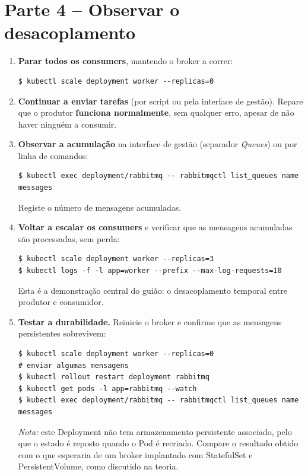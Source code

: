 \documentclass[11pt,a4paper]{article}
\begin{document}
\section{Parte 4 -- Observar o desacoplamento}
\begin{enumerate}[label=\arabic*.,resume]

  \item \textbf{Parar todos os consumers}, mantendo o broker a correr:
\begin{lstlisting}
$ kubectl scale deployment worker --replicas=0
\end{lstlisting}

  \item \textbf{Continuar a enviar tarefas} (por script ou pela interface de gestão). Repare que o produtor \textbf{funciona normalmente}, sem qualquer erro, apesar de não haver ninguém a consumir.

  \item \textbf{Observar a acumulação} na interface de gestão (separador \emph{Queues}) ou por linha de comandos:
\begin{lstlisting}
$ kubectl exec deployment/rabbitmq -- rabbitmqctl list_queues name messages
\end{lstlisting}
  Registe o número de mensagens acumuladas.

  \item \textbf{Voltar a escalar os consumers} e verificar que as mensagens acumuladas são processadas, sem perda:
\begin{lstlisting}
$ kubectl scale deployment worker --replicas=3
$ kubectl logs -f -l app=worker --prefix --max-log-requests=10
\end{lstlisting}
  Esta é a demonstração central do guião: o desacoplamento temporal entre produtor e consumidor.

  \item \textbf{Testar a durabilidade.} Reinicie o broker e confirme que as mensagens persistentes sobrevivem:
\begin{lstlisting}
$ kubectl scale deployment worker --replicas=0
# enviar algumas mensagens
$ kubectl rollout restart deployment rabbitmq
$ kubectl get pods -l app=rabbitmq --watch
$ kubectl exec deployment/rabbitmq -- rabbitmqctl list_queues name messages
\end{lstlisting}
  \emph{Nota:} este Deployment não tem armazenamento persistente associado, pelo que o estado é reposto quando o Pod é recriado. Compare o resultado obtido com o que esperaria de um broker implantado com StatefulSet e PersistentVolume, como discutido na teoria.

\end{enumerate}
\end{document}

